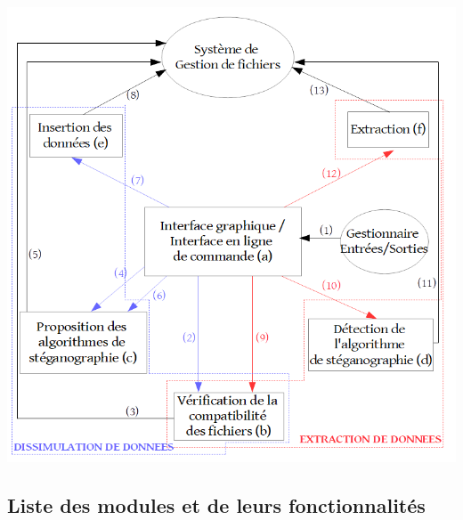 \documentclass[11pt]{article}
\begin{document}
\hspace{0.5cm}
\includegraphics[scale=0.55]{pictures/organigramme2.png}

\subsection{Liste des modules et de leurs fonctionnalités}
\end{document}
